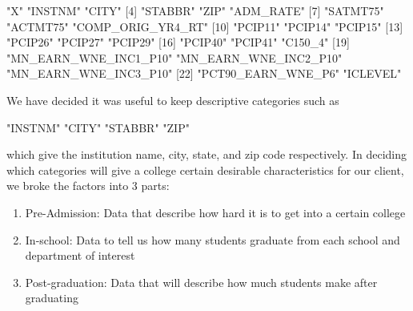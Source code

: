 \documentclass{article}
\begin{document}
\begin{Schunk}
\begin{Soutput}
 [1] "X"                    "INSTNM"               "CITY"                
 [4] "STABBR"               "ZIP"                  "ADM_RATE"            
 [7] "SATMT75"              "ACTMT75"              "COMP_ORIG_YR4_RT"    
[10] "PCIP11"               "PCIP14"               "PCIP15"              
[13] "PCIP26"               "PCIP27"               "PCIP29"              
[16] "PCIP40"               "PCIP41"               "C150_4"              
[19] "MN_EARN_WNE_INC1_P10" "MN_EARN_WNE_INC2_P10" "MN_EARN_WNE_INC3_P10"
[22] "PCT90_EARN_WNE_P6"    "ICLEVEL"             
\end{Soutput}
\end{Schunk}
We have decided it was useful to keep descriptive categories such as 
\begin{Schunk}
\begin{Soutput}
[1] "INSTNM" "CITY"   "STABBR" "ZIP"   
\end{Soutput}
\end{Schunk}

which give the institution name, city, state, and zip code respectively.  In deciding which categories will give a college certain desirable characteristics for our client, we broke the factors into 3 parts:

\begin{enumerate}
\item Pre-Admission: Data that describe how hard it is to get into a certain college
\item In-school: Data to tell us how many students graduate from each school and department of interest
\item Post-graduation: Data that will describe how much students make after graduating
\end{enumerate}
\end{document}
